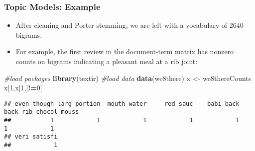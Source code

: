 \documentclass[
  shownotes,
  xcolor={svgnames},
  hyperref={colorlinks,citecolor=DarkBlue,linkcolor=DarkRed,urlcolor=DarkBlue}
  , aspectratio=169]{beamer}
\newenvironment{Shaded}{\begin{snugshade}}{\end{snugshade}}
\newcommand{\CommentTok}[1]{\textcolor[rgb]{0.56,0.35,0.01}{\textit{#1}}}
\newcommand{\DecValTok}[1]{\textcolor[rgb]{0.00,0.00,0.81}{#1}}
\newcommand{\KeywordTok}[1]{\textcolor[rgb]{0.13,0.29,0.53}{\textbf{#1}}}
\newcommand{\NormalTok}[1]{#1}
\newcommand{\OperatorTok}[1]{\textcolor[rgb]{0.81,0.36,0.00}{\textbf{#1}}}
\newcommand{\StringTok}[1]{\textcolor[rgb]{0.31,0.60,0.02}{#1}}
\begin{document}
\begin{frame}[fragile]
\frametitle{Topic Models: Example}
\begin{itemize}


\item After cleaning and Porter stemming, we are left with a vocabulary of 2640 bigrams. 
\item For example, the first review in the document-term matrix has nonzero counts on bigrams indicating a pleasant meal at a rib joint: 
\end{itemize}

\begin{scriptsize}

\begin{Shaded}
\begin{Highlighting}[]
\CommentTok{\#load packages}
\KeywordTok{library}\NormalTok{(textir) }
\CommentTok{\#load data}
\KeywordTok{data}\NormalTok{(we8there)}
\NormalTok{x \textless{}{-}}\StringTok{ }\NormalTok{we8thereCounts}
\NormalTok{x[}\DecValTok{1}\NormalTok{,x[}\DecValTok{1}\NormalTok{,]}\OperatorTok{!=}\DecValTok{0}\NormalTok{]}
\end{Highlighting}
\end{Shaded}

\end{scriptsize}
\begin{tiny}



\begin{verbatim}
## even though larg portion  mouth water     red sauc    babi back     back rib chocol mouss 
##           1            1            1            1            1            1            1 
## veri satisfi 
##            1 
\end{verbatim}
\end{tiny}
\end{frame}
\end{document}
